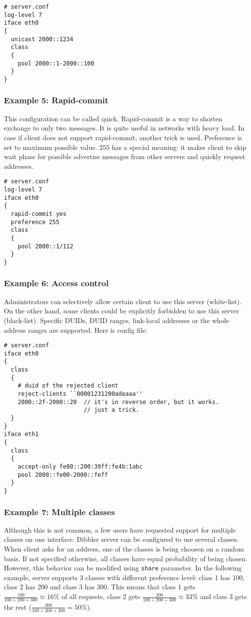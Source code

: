\begin{lstlisting}
# server.conf
log-level 7
iface eth0
{
  unicast 2000::1234
  class
  {
    pool 2000::1-2000::100
  }
}
\end{lstlisting}

\subsubsection{Example 5: Rapid-commit}
This configuration can be called quick. Rapid-commit is a way to shorten exchange to only two messages. It is
quite useful in networks with heavy load. In case if client does not
support rapid-commit, another trick is used. Preference is set to
maximum possible value. 255 has a special meaning: it makes client to
skip wait phase for possible advertise messages from other servers and
quickly request addresses.

\begin{lstlisting}
# server.conf
log-level 7
iface eth0
{
  rapid-commit yes
  preference 255
  class
  {
    pool 2000::1/112
  }
}
\end{lstlisting}

\subsubsection{Example 6: Access control}
Administrators can selectively allow certain client to use this
server (white-list). On the other hand, some clients could be
explicitly forbidden to use this server (black-list). Specific DUIDs,
DUID ranges, link-local addresses or the whole address ranges are
supported. Here is config file:

\begin{lstlisting}
# server.conf
iface eth0
{
  class
  {
    # duid of the rejected client
    reject-clients ``00001231200adeaaa''
    2000::2f-2000::20  // it's in reverse order, but it works.
                       // just a trick.
  }
}
iface eth1
{
  class
  {
    accept-only fe80::200:39ff:fe4b:1abc
    pool 2000::fe00-2000::feff
  }
}
\end{lstlisting}

\subsubsection{Example 7: Multiple classes}
\label{example-server-multiple-classes}
Although this is not common, a few users have requested support for multiple classes on one interface.
Dibbler server can be configured to use several classes. When client asks for an address, one of the classes
is being choosen on a random basis. If not specified otherwise, all classes have equal probability of being chosen.
However, this behavior can be modified using \verb+share+ parameter. In the following example, server supports
3 classes with different preference level: class 1 has 100, class 2 has 200 and class 3 has 300. This means that class 1
gets $\frac{100}{100+200+300} \approx 16\% $ of all requests, class 2
gets $\frac{200}{100+200+300} \approx 33\% $ and class 3 gets the rest
($\frac{300}{100+200+300}=50\% $).

